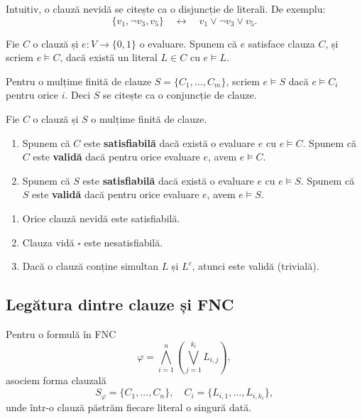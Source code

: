 Intuitiv, o clauză nevidă se citește ca o disjuncție de literali. De exemplu:
\[
	\{v_1, \neg v_3, v_5\} \quad \leftrightarrow \quad v_1 \lor \neg v_3 \lor v_5.
\]

\begin{definition}
	Fie \(C\) o clauză și \(e: V \to \{0,1\}\) o evaluare.
	Spunem că \(e\) satisface clauza \(C\), și scriem \(e \models C\), dacă există un literal \(L \in C\) cu \(e \models L\).

	\noindent Pentru o mulțime finită de clauze \(S = \{C_1, \dots, C_m\}\), scriem \(e \models S\) dacă \(e \models C_i\) pentru orice \(i\). Deci \(S\) se citește ca o conjuncție de clauze.
\end{definition}

\begin{definition}
	Fie \(C\) o clauză și \(S\) o mulțime finită de clauze.
	\begin{enumerate}
		\item Spunem că \(C\) este \textbf{satisfiabilă} dacă există o evaluare \(e\) cu \(e \models C\). Spunem că \(C\) este \textbf{validă} dacă pentru orice evaluare \(e\), avem \(e \models C\).
		\item Spunem că \(S\) este \textbf{satisfiabilă} dacă există o evaluare \(e\) cu \(e \models S\). Spunem că \(S\) este \textbf{validă} dacă pentru orice evaluare \(e\), avem \(e \models S\).
	\end{enumerate}
\end{definition}

\begin{prop}
    \noindent
	\begin{enumerate}
		\item Orice clauză nevidă este satisfiabilă.
		\item Clauza vidă \( \square \) este nesatisfiabilă.
		\item Dacă o clauză conține simultan \(L\) și \(L^c\), atunci este validă (trivială).
	\end{enumerate}
\end{prop}

\subsection{Legătura dintre clauze și FNC}

Pentru o formulă în FNC
\[
	\varphi = \bigwedge_{i=1}^{n}\left(\bigvee_{j=1}^{k_i} L_{i,j}\right),
\]
asociem forma clauzală
\[
	S_\varphi = \{C_1, \dots, C_n\}, \quad C_i = \{L_{i,1}, \dots, L_{i,k_i}\},
\]
unde într-o clauză păstrăm fiecare literal o singură dată.


